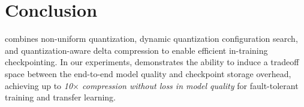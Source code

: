 \section{Conclusion}
\label{sec:conclusion}


\sys combines non-uniform quantization, dynamic quantization configuration search, and quantization-aware delta compression to enable efficient in-training checkpointing. In our experiments, \sys demonstrates the ability to induce a tradeoff space between the end-to-end model quality and checkpoint storage overhead, achieving up to \textit{10$\times$ compression without loss in model quality} for fault-tolerant training and transfer learning.



